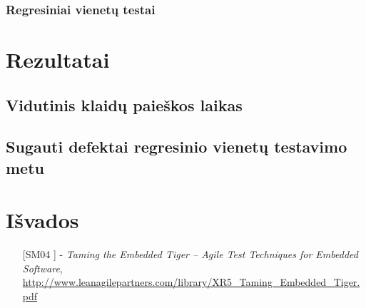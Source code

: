 \documentclass[12pt, a4paper, lithuanian, final]{article}
\begin{document}
\subsubsection{Regresiniai vienetų testai}








\section{Rezultatai}


\subsection{Vidutinis klaidų paieškos laikas}

\subsection{Sugauti defektai regresinio vienetų testavimo metu}



\section{Išvados}


\begin{itemize}
	\item [[SM04]] - \textit{Taming the Embedded Tiger – Agile Test Techniques for Embedded Software}, \url{http://www.leanagilepartners.com/library/XR5_Taming_Embedded_Tiger.pdf}

\end{itemize}
\end{document}
